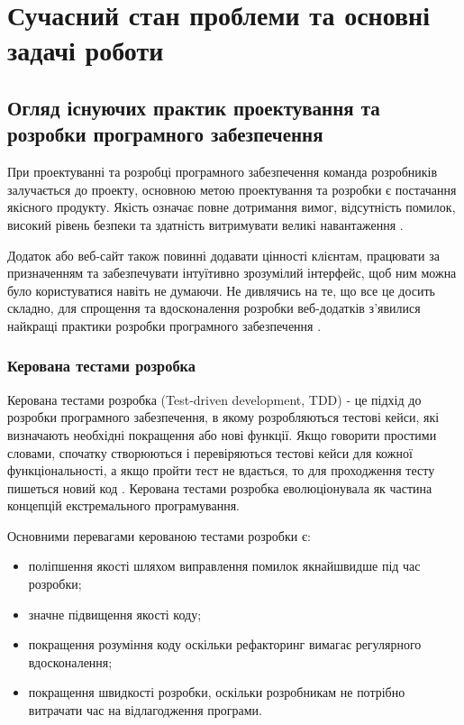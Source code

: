 \section[СУЧАСНИЙ СТАН ПРОБЛЕМИ ТА ОСНОВНІ ЗАДАЧІ РОБОТИ]{Сучасний стан проблеми та основні задачі роботи}

\subsection{Огляд існуючих практик проектування та розробки програмного забезпечення}

При проектуванні та розробці програмного забезпечення команда
розробників залучається до проекту, основною метою проектування
та розробки є постачання якісного продукту.
Якість означає повне дотримання вимог, відсутність помилок,
високий рівень безпеки та здатність витримувати великі навантаження 
\cite{tdd-bdd-article}.

Додаток або веб-сайт також повинні додавати цінності клієнтам,
працювати за призначенням та забезпечувати інтуїтивно зрозумілий інтерфейс,
щоб ним можна було користуватися навіть не думаючи. Не дивлячись на те,
що все це досить складно, для спрощення та вдосконалення розробки веб-додатків з’явилися
найкращі практики розробки програмного забезпечення \cite{business-rybakov}.

\subsubsection{Керована тестами розробка}

Керована тестами розробка (Test-driven development, TDD) 
- це підхід до розробки програмного забезпечення,
в якому розробляються тестові кейси, які визначають необхідні покращення або нові функції.
Якщо говорити простими словами, спочатку створюються і перевіряються тестові кейси
для кожної функціональності, а якщо пройти тест не вдається,
то для проходження тесту пишеться новий код \cite{tdd-article}.
Керована тестами розробка еволюціонувала як частина концепцій екстремального програмування.

\clearpage
Основними перевагами керованою тестами розробки є:

\begin{itemize}
    \item поліпшення якості шляхом виправлення помилок якнайшвидше під час розробки;
		\item значне підвищення якості коду;
		\item покращення розуміння коду оскільки рефакторинг
			вимагає регулярного вдосконалення;
		\item покращення швидкості розробки, оскільки розробникам
			не потрібно витрачати час на відлагодження програми.
\end{itemize}

